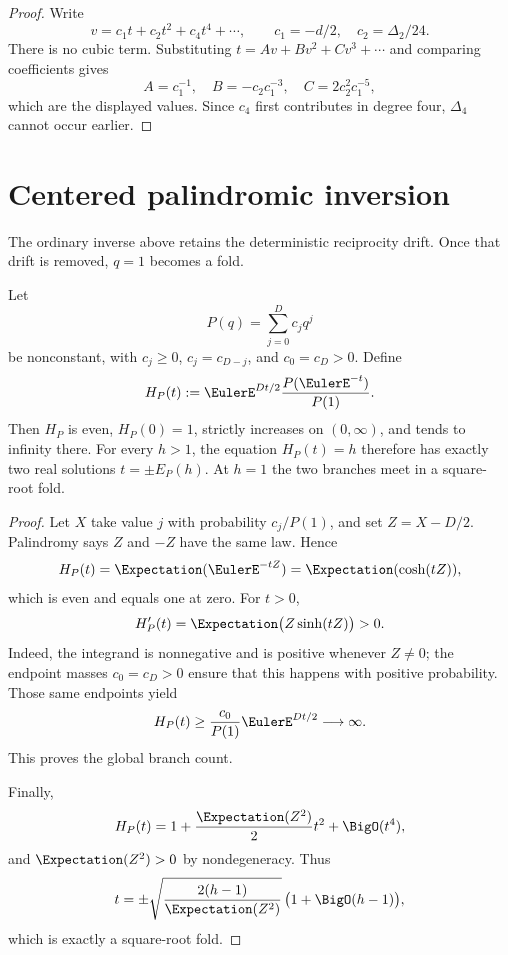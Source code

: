 \begin{proof}
Write
\[
  v=c_1t+c_2t^2+c_4t^4+\cdots,
  \qquad c_1=-d/2,\quad c_2=\Delta_2/24.
\]
There is no cubic term.  Substituting
\(t=Av+Bv^2+Cv^3+\cdots\) and comparing coefficients gives
\[
  A=c_1^{-1},\quad
  B=-c_2c_1^{-3},\quad
  C=2c_2^2c_1^{-5},
\]
which are the displayed values.  Since \(c_4\) first contributes in degree
four, \(\Delta_4\) cannot occur earlier.
\end{proof}

\section{Centered palindromic inversion}
\label{sec:centered-palindromic}

The ordinary inverse above retains the deterministic reciprocity drift.  Once
that drift is removed, \(q=1\) becomes a fold.

\begin{theorem}
\label{thm:gq-centered-palindromic}
Let
\[
  P(q)=\sum_{j=0}^{D}c_jq^j
\]
be nonconstant, with \(c_j\ge0\), \(c_j=c_{D-j}\), and
\(c_0=c_D>0\).  Define
\[
  H_P(t):=\EulerE^{Dt/2}\frac{P(\EulerE^{-t})}{P(1)}.
\]
Then \(H_P\) is even, \(H_P(0)=1\), strictly increases on
\((0,\infty)\), and tends to infinity there.  For every \(h>1\), the equation
\(H_P(t)=h\) therefore has exactly two real solutions
\(t=\pm E_P(h)\).  At \(h=1\) the two branches meet in a square-root fold.
\end{theorem}

\begin{proof}
Let \(X\) take value \(j\) with probability \(c_j/P(1)\), and set
\(Z=X-D/2\).  Palindromy says \(Z\) and \(-Z\) have the same law.  Hence
\[
  H_P(t)=\Expectation(\EulerE^{-tZ})=\Expectation(\cosh(tZ)),
\]
which is even and equals one at zero.  For \(t>0\),
\[
  H_P'(t)=\Expectation\bigl(Z\sinh(tZ)\bigr)>0.
\]
Indeed, the integrand is nonnegative and is positive whenever \(Z\ne0\);
the endpoint masses \(c_0=c_D>0\) ensure that this happens with positive
probability.  Those same endpoints yield
\[
  H_P(t)\ge\frac{c_0}{P(1)}\EulerE^{Dt/2}\longrightarrow\infty.
\]
This proves the global branch count.

Finally,
\[
  H_P(t)=1+\frac{\Expectation(Z^2)}2t^2+\BigO(t^4),
\]
and \(\Expectation(Z^2)>0\) by nondegeneracy.  Thus
\[
  t=\pm\sqrt{\frac{2(h-1)}{\Expectation(Z^2)}}\,
  \bigl(1+\BigO(h-1)\bigr),
\]
which is exactly a square-root fold.
\end{proof}

